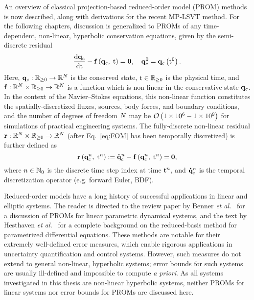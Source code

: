 An overview of classical projection-based reduced-order model (PROM) methods is now described, along with derivations for the recent MP-LSVT method. For the following chapters, discussion is generalized to PROMs of any time-dependent, non-linear, hyperbolic conservation equations, given by the semi-discrete residual
%
\begin{equation}\label{eq:FOM}
    \frac{\text{d} \mathbf{q}_{c}}{\text{d} \text{t}} - \mathbf{f} \left(\mathbf{q}_{c}, \; \text{t}\right) = \mathbf{0}, \quad \mathbf{q}_{c}^0 = \mathbf{q}_{c} \left(\text{t}^0\right).
\end{equation}
%
Here, $\mathbf{q}_{c}: \mathbb{R}_{\ge 0} \rightarrow \mathbb{R}^{N}$ is the conserved state, $\text{t} \in \mathbb{R}_{\ge 0}$ is the physical time, and $\mathbf{f}: \mathbb{R}^{N} \times \mathbb{R}_{\ge 0} \rightarrow \mathbb{R}^{N}$ is a function which is non-linear in the conservative state $\mathbf{q}_{c}$. In the context of the Navier--Stokes equations, this non-linear function constitutes the spatially-discretized fluxes, sources, body forces, and boundary conditions, and the number of degrees of freedom $N$ may be $\mathcal{O}\left(1 \times 10^6 - 1 \times 10^9\right)$ for simulations of practical engineering systems. The fully-discrete non-linear residual $\mathbf{r}: \mathbb{R}^{N} \times \mathbb{R}_{\ge 0} \rightarrow \mathbb{R}^{N}$ (after Eq.~\ref{eq:FOM} has been temporally discretized) is further defined as
%
\begin{equation}
    \mathbf{r}\left(\mathbf{q}_{c}^{n}, \; \text{t}^{n}\right) := \accentset{\mbox{\large\bfseries .}}{\mathbf{q}}_{c}^{n} - \mathbf{f} \left(\mathbf{q}_{c}^{n}, \; \text{t}^{n}\right) = \mathbf{0},
\end{equation}
%
where $n \in \mathbb{N}_0$ is the discrete time step index at time $\text{t}^{n}$, and $\accentset{\mbox{\large\bfseries .}}{\mathbf{q}}_{c}^{n}$ is the temporal discretization operator (e.g. forward Euler, BDF).

Reduced-order models have a long history of successful applications in linear and elliptic systems. The reader is directed to the review paper by Benner \textit{et al.}~\cite{Benner2015} for a discussion of PROMs for linear parametric dynamical systems, and the text by Hesthaven \textit{et al.}~\cite{certRedBasisBook} for a complete background on the reduced-basis method for parametrized differential equations. These methods are notable for their extremely well-defined error measures, which enable rigorous applications in uncertainty quantification and control systems. However, such measures do not extend to general non-linear, hyperbolic systems; error bounds for such systems are usually ill-defined and impossible to compute \textit{a priori}. As all systems investigated in this thesis are non-linear hyperbolic systems, neither PROMs for linear systems nor error bounds for PROMs are discussed here.